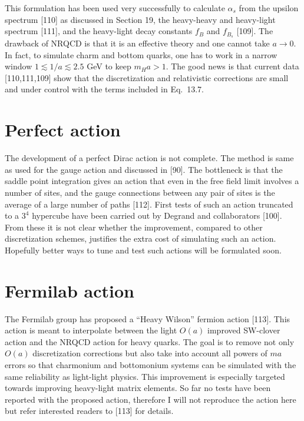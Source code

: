 This formulation has been used very successfully to calculate
$\alpha_s$ from the upsilon spectrum [110] as discussed
in Section 19, the heavy-heavy and heavy-light spectrum
[111], and the heavy-light decay constants $f_B$ and $f_{B_s}$
[109].  The drawback of NRQCD is that it is an effective theory
and one cannot take $a \to 0$.  In fact, to simulate charm and bottom
quarks, one has to work in a narrow window $1 \lesssim 1/a \lesssim 2.5$
GeV to keep $m_H a > 1$.  The good news is that current data
[110,111,109] show that
the discretization and relativistic corrections are small and under
control with the terms included in Eq.~13.7.

\section{Perfect action}

The development of a perfect Dirac action is not complete.  The method
is same as used for the gauge action and discussed in [90].
The bottleneck is that the saddle point integration gives an action that even
in the free field limit involves a number of sites, and the gauge
connections between any pair of sites is the average of a large number
of paths [112].  First tests of such an action truncated to
a $3^4$ hypercube have been carried out by Degrand and collaborators
[100].  From these it is not clear whether the
improvement, compared to other discretization schemes, justifies the
extra cost of simulating such an action.  Hopefully better ways to tune
and test such actions will be formulated soon.

\section{Fermilab action}

The Fermilab group has proposed a ``Heavy Wilson'' fermion action
[113].  This action is meant to interpolate between the
light $O(a)$ improved SW-clover action and the NRQCD action for heavy
quarks.  The goal is to remove not only $O(a)$ discretization
corrections but also take into account all powers of $ma$ errors so
that charmonium and bottomonium systems can be simulated with the same
reliability as light-light physics.  This improvement is especially
targeted towards improving heavy-light matrix elements.  So far no
tests have been reported with the proposed action, therefore I will
not reproduce the action here but refer interested readers to
[113] for details.

